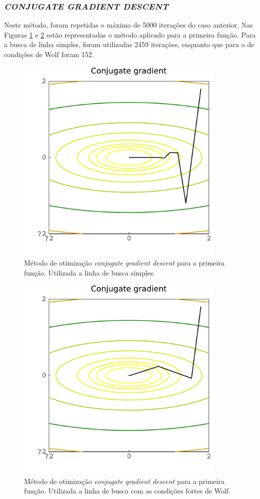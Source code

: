 \documentclass[12pt]{article}
\begin{document}
\subsubsection{\textit{CONJUGATE GRADIENT DESCENT}}
Neste método, foram repetidas o máximo de 5000 iterações do caso anterior. Nas Figuras \ref{fig:conj1f} e \ref{fig:conj2f} estão representadas o método aplicado para a primeira função. Para a busca de linha simples, foram utilizadas 2459 iterações, enquanto que para o de condições de Wolf foram 152.
\begin{figure}[ht!]
	\centering
	\includegraphics[width=10cm]{Figuras/Conjugate_gradient_linef2}
	\caption{Método de otimização \textit{conjugate gradient descent} para a primeira função. Utilizada a linha de busca simples.}
	\label{fig:conj1f}
\end{figure} 
\begin{figure}[ht!]
	\centering
	\includegraphics[width=10cm]{Figuras/Conjugate_gradient_wolff2}
	\caption{Método de otimização \textit{conjugate gradient descent} para a primeira função. Utilizada a linha de busca com as condições fortes de Wolf.}
	\label{fig:conj2f}
\end{figure} 
\end{document}
